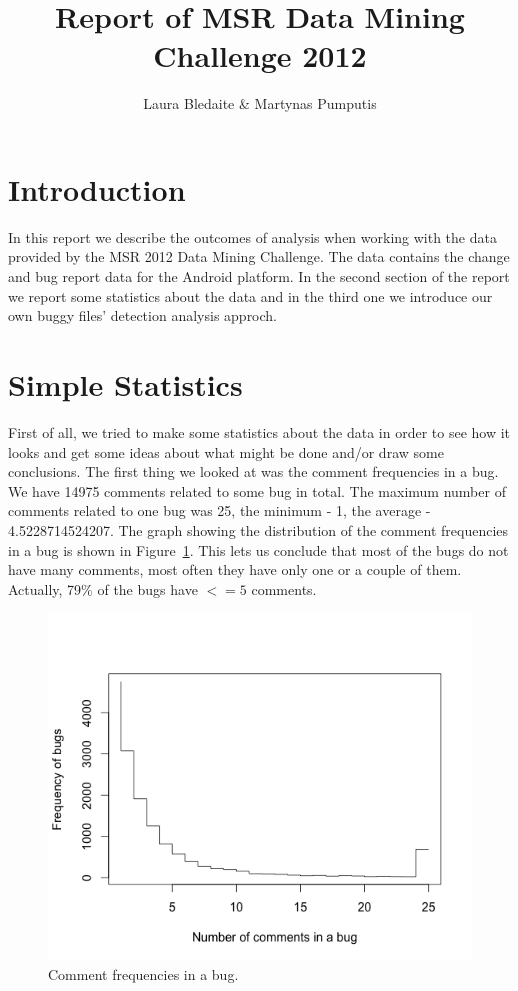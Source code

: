 \documentclass[a4paper,11pt]{article}
\begin{document}
\title{Report of MSR Data Mining Challenge 2012}
\author{Laura Bledaite \& Martynas Pumputis}
\maketitle
\section{Introduction}
In this report we describe the outcomes of analysis when working with the data provided by the MSR 2012 Data Mining Challenge. The data contains the change and bug report data for the Android platform. In the second section of the report we report some statistics about the data and in the third one we introduce our own buggy files' detection analysis approch.

\section{Simple Statistics}
First of all, we tried to make some statistics about the data in order to see how it looks and get some ideas about what might be done and/or draw some conclusions.
The first thing we looked at was the comment frequencies in a bug. We have 14975 comments related to some bug in total. The maximum number of comments related to one bug was 25, the minimum - 1, the average - 4.5228714524207. The graph showing the distribution of the comment frequencies in a bug is shown in Figure~\ref{fig:com_freq}. This lets us conclude that most of the bugs do not have many comments, most often they have only one or a couple of them. Actually, 79\% of the bugs have $<=5$ comments.

\begin{figure}[ht!]
\centering
\includegraphics[width=.7\textwidth]{../diagrams/comment_frequencies.png}
\caption{Comment frequencies in a bug.}
\label{fig:com_freq}
\end{figure}
\end{document}
